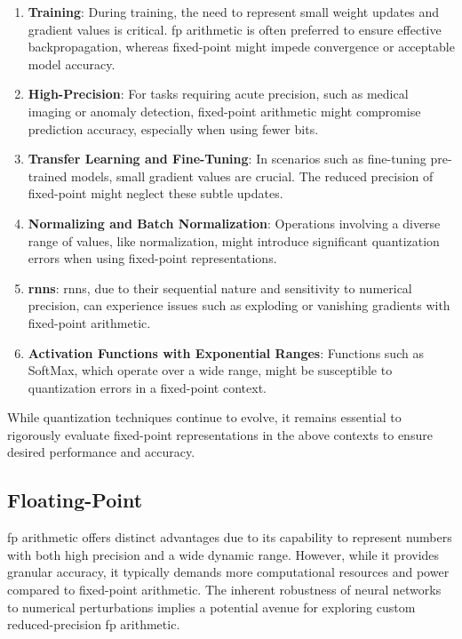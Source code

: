 \begin{enumerate}
	\item \textbf{Training}: During training, the need to represent small weight updates and gradient values is critical. \gls{fp} arithmetic is often preferred to ensure effective backpropagation, whereas fixed-point might impede convergence or acceptable model accuracy.
	
	\item \textbf{High-Precision}: For tasks requiring acute precision, such as medical imaging or anomaly detection, fixed-point arithmetic might compromise prediction accuracy, especially when using fewer bits.
	
	\item \textbf{Transfer Learning and Fine-Tuning}: In scenarios such as fine-tuning pre-trained models, small gradient values are crucial. The reduced precision of fixed-point might neglect these subtle updates.
	
	\item \textbf{Normalizing and Batch Normalization}: Operations involving a diverse range of values, like normalization, might introduce significant quantization errors when using fixed-point representations.
	
	\item \textbf{\glspl{rnn}}: \glspl{rnn}, due to their sequential nature and sensitivity to numerical precision, can experience issues such as exploding or vanishing gradients with fixed-point arithmetic.
	
	\item \textbf{Activation Functions with Exponential Ranges}: Functions such as SoftMax, which operate over a wide range, might be susceptible to quantization errors in a fixed-point context.
\end{enumerate}

While quantization techniques continue to evolve, it remains essential to rigorously evaluate fixed-point representations in the above contexts to ensure desired performance and accuracy.



\subsection{Floating-Point}
\gls{fp} arithmetic offers distinct advantages due to its capability to represent numbers with both high precision and a wide dynamic range. However, while it provides granular accuracy, it typically demands more computational resources and power compared to fixed-point arithmetic. The inherent robustness of neural networks to numerical perturbations implies a potential avenue for exploring custom reduced-precision \gls{fp} arithmetic.

